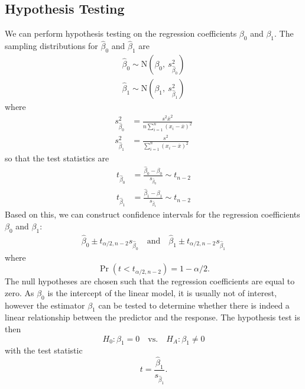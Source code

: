 \documentclass{article}
\begin{document}
\subsection{Hypothesis Testing}
We can perform hypothesis testing on the regression coefficients
\(\beta_0\) and \(\beta_1\). The sampling distributions for
\(\hat{\beta}_0\) and \(\hat{\beta}_1\) are
\begin{align*}
    \hat{\beta}_0 \sim \mathrm{N}\left( \beta_0,\: s^2_{\hat{\beta}_0} \right) \\
    \hat{\beta}_1 \sim \mathrm{N}\left( \beta_1,\: s^2_{\hat{\beta}_1} \right)
\end{align*}
where
\begin{align*}
    s^2_{\hat{\beta}_0} & = \frac{s^2 \overline{x}^2}{n \sum_{i = 1}^n \left( x_i - \overline{x} \right)^2} \\
    s^2_{\hat{\beta}_1} & = \frac{s^2}{\sum_{i = 1}^n \left( x_i - \overline{x} \right)^2}
\end{align*}
so that the test statistics are
\begin{align*}
    t_{\hat{\beta}_0} & = \frac{\hat{\beta}_0 - \beta_0}{s_{\hat{\beta}_0}} \sim t_{n - 2} \\
    t_{\hat{\beta}_1} & = \frac{\hat{\beta}_1 - \beta_1}{s_{\hat{\beta}_1}} \sim t_{n - 2}
\end{align*}
Based on this, we can construct confidence intervals for the regression coefficients \(\beta_0\) and \(\beta_1\):
\begin{align*}
    \hat{\beta}_0 \pm t_{\alpha / 2, n - 2} s_{\hat{\beta}_0} \quad \text{and} \quad \hat{\beta}_1 \pm t_{\alpha / 2, n - 2} s_{\hat{\beta}_1}
\end{align*}
where
\begin{equation*}
    \Pr{\left( t < t_{\alpha / 2, n - 2} \right)} = 1 - \alpha / 2.
\end{equation*}
The null hypotheses are chosen such that the regression coefficients are equal to zero.
As \(\beta_0\) is the intercept of the linear model, it is usually not of interest, however the estimator \(\beta_1\)
can be tested to determine whether there is indeed a linear relationship between the predictor and the response.
The hypothesis test is then
\begin{equation*}
    H_0 : \beta_1 = 0 \quad \text{vs.} \quad H_A : \beta_1 \neq 0
\end{equation*}
with the test statistic
\begin{equation*}
    t = \frac{\hat{\beta}_1}{s_{\hat{\beta}_1}}.
\end{equation*}
\end{document}
